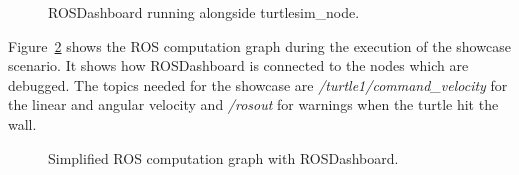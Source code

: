 \begin{figure}[thpb]
  \centering
  \caption{ROSDashboard running alongside turtlesim\_node.}
  \label{showcase}
\end{figure}

Figure~\ref{rosgraph_simple} shows the ROS computation graph during the execution of the showcase scenario. It shows how ROSDashboard is connected to the nodes which are debugged. The topics needed for the showcase are \emph{/turtle1/command\_velocity} for the linear and angular velocity and \emph{/rosout} for warnings when the turtle hit the wall.

\begin{figure}[thpb]
  \centering
  \caption{Simplified ROS computation graph with ROSDashboard.}
  \label{rosgraph_simple}
\end{figure}

